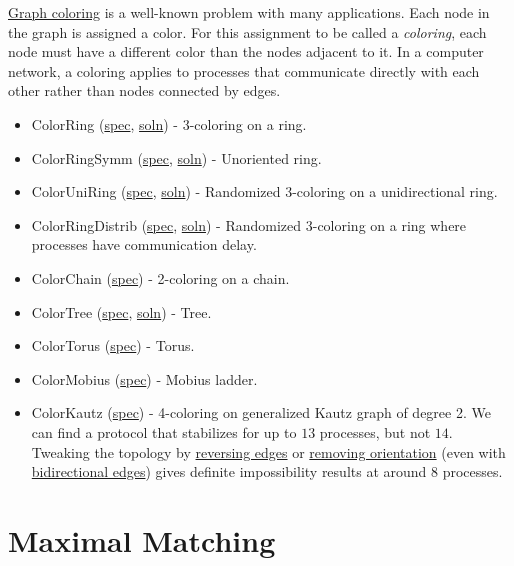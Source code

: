 \href{http://en.wikipedia.org/wiki/Graph_coloring}{Graph coloring} is a well-known problem with many applications.
Each node in the graph is assigned a color.
For this assignment to be called a \textit{coloring}, each node must have a different color than the nodes adjacent to it.
In a computer network, a coloring applies to processes that communicate directly with each other rather than nodes connected by edges.
\begin{itemize}
\item ColorRing (\href{examplespec/ColorRing.prot}{spec}, \href{examplesoln/ColorRing.prot}{soln})
- 3-coloring on a ring.
\item ColorRingSymm (\href{examplespec/ColorRingSymm.prot}{spec}, \href{examplesoln/ColorRingSymm.prot}{soln})
- Unoriented ring.
\item ColorUniRing (\href{examplespec/ColorUniRing.prot}{spec}, \href{examplesoln/ColorUniRing.prot}{soln})
- Randomized 3-coloring on a unidirectional ring.
\item ColorRingDistrib (\href{examplespec/ColorRingDistrib.prot}{spec}, \href{examplesoln/ColorRingDistrib.prot}{soln})
- Randomized 3-coloring on a ring where processes have communication delay.
\item ColorChain (\href{examplespec/ColorChain.prot}{spec})
- 2-coloring on a chain.
\item ColorTree (\href{examplespec/ColorTree.prot}{spec}, \href{examplesoln/ColorTree.prot}{soln})
- Tree.
\item ColorTorus (\href{examplespec/ColorTorus.prot}{spec})
- Torus.
\item ColorMobius (\href{examplespec/ColorMobius.prot}{spec})
- Mobius ladder.
\item ColorKautz (\href{examplespec/ColorKautz.prot}{spec})
- 4-coloring on generalized Kautz graph of degree 2.
We can find a protocol that stabilizes for up to $13$ processes, but not $14$.
Tweaking the topology by
\href{examplespec/ColorKautzReverse.prot}{reversing edges}
or
\href{examplespec/ColorKautzSymm.prot}{removing orientation}
(even with \href{examplespec/ColorKautzBi.prot}{bidirectional edges})
gives definite impossibility results at around $8$ processes.
\end{itemize}

\section{Maximal Matching}

